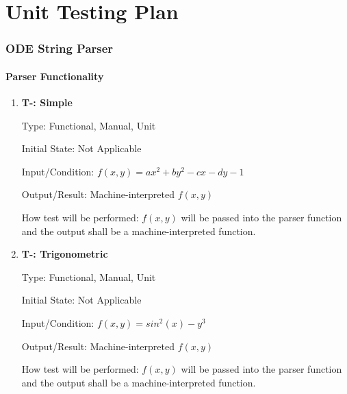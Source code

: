 \documentclass[12pt, titlepage]{article}
\newcounter{tnum} %
\begin{document}
\section{Unit Testing Plan}
		

\subsubsection{ODE String Parser}

\paragraph{Parser Functionality}

\begin{enumerate}

\item{\textbf{T-\thetnum \label{t-parser1}: Simple}}

Type: Functional, Manual, Unit 
					
Initial State: Not Applicable
					
Input/Condition: $f(x, y) = ax^2 + by^2 - cx - dy - 1$
					
Output/Result: Machine-interpreted $f(x, y)$
					
How test will be performed: $f(x, y)$ will be passed into the parser function and the output shall be a
machine-interpreted function.


\item{\textbf{T-\thetnum \label{t-parser1}: Trigonometric}}

Type: Functional, Manual, Unit 
					
Initial State: Not Applicable
					
Input/Condition: $f(x, y) = sin^2(x) - y^3$
					
Output/Result: Machine-interpreted $f(x, y)$
					
How test will be performed: $f(x, y)$ will be passed into the parser function and the output shall be a
machine-interpreted function.

\end{enumerate}

\end{document}

